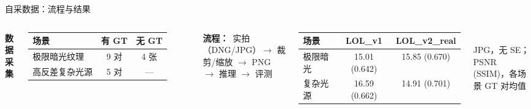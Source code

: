 \documentclass[aspectratio=169,10pt]{beamer}
\begin{document}
\begin{frame}{自采数据：流程与结果}
  \vspace{-0.65em}
  \begin{columns}[T]
    \scriptsize
    \textbf{数据采集}
    \begin{tabular}{lcc}
      \toprule
      场景 & 有 GT & 无 GT \\
      \midrule
      极限暗光纹理   & 9 对 & 4 张 \\
      高反差复杂光源 & 5 对 & --- \\
      \bottomrule
    \end{tabular}

    \vspace{0.08em}
    \textbf{流程：}\ {\tiny 实拍（DNG/JPG）$\rightarrow$ 裁剪/缩放 $\rightarrow$ PNG $\rightarrow$ 推理 $\rightarrow$ 评测}

    \centering
    \scriptsize
    \renewcommand{\arraystretch}{1.12}
    \begin{tabular}{lcc}
      \toprule
      场景 & LOL\_v1 & LOL\_v2\_real \\
      \midrule
      极限暗光 &
        15.01 (0.642) & 15.85 (0.670) \\
      复杂光源 &
        16.59 (0.662) & 14.91 (0.701) \\
      \bottomrule
    \end{tabular}\\[0.2em]
    {\scriptsize JPG，无 SE；PSNR (SSIM)，各场景 GT 对均值}
  \end{columns}


\end{frame}
\end{document}
